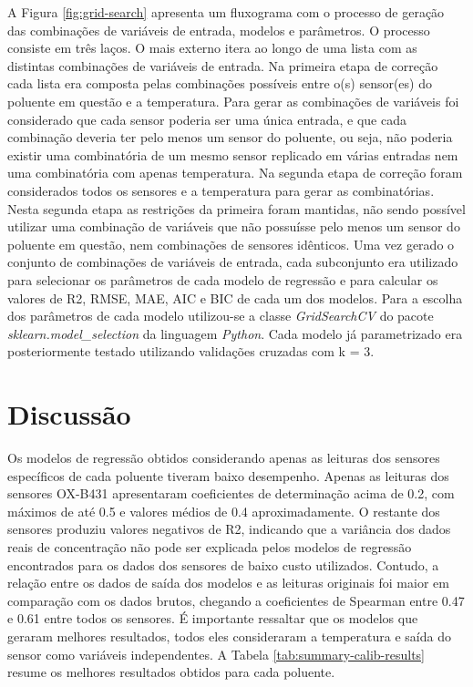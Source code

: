 A Figura \ref{fig:grid-search} apresenta um fluxograma com o processo de geração das combinações de variáveis de entrada, modelos e parâmetros. O processo consiste em três laços. O mais externo itera ao longo de uma lista com as distintas combinações de variáveis de entrada. Na primeira etapa de correção cada lista era composta pelas combinações possíveis entre o(s) sensor(es) do poluente em questão e a temperatura. Para gerar as combinações de variáveis foi considerado que cada sensor poderia ser uma única entrada, e que cada combinação deveria ter pelo menos um sensor do poluente, ou seja, não poderia existir uma combinatória de um mesmo sensor replicado em várias entradas nem uma combinatória com apenas temperatura. Na segunda etapa de correção foram considerados todos os sensores e a temperatura para gerar as combinatórias. Nesta segunda etapa as restrições da primeira foram mantidas, não sendo possível utilizar uma combinação de variáveis que não possuísse pelo menos um sensor do poluente em questão, nem combinações de sensores idênticos. Uma vez gerado o conjunto de combinações de variáveis de entrada, cada subconjunto era utilizado para selecionar os parâmetros de cada modelo de regressão e para calcular os valores de R2, RMSE, MAE, AIC e BIC de cada um dos modelos. Para a escolha dos parâmetros de cada modelo utilizou-se a classe \textit{GridSearchCV} do pacote \textit{sklearn.model\_selection} da linguagem \textit{Python}. Cada modelo já parametrizado era posteriormente testado utilizando validações cruzadas com k = 3.









\section{Discussão}

Os modelos de regressão obtidos considerando apenas as leituras dos sensores específicos de cada poluente tiveram baixo desempenho. Apenas as leituras dos sensores OX-B431 apresentaram coeficientes de determinação acima de 0.2, com máximos de até 0.5 e valores médios de 0.4 aproximadamente. O restante dos sensores produziu valores negativos de R2, indicando que a variância dos dados reais de concentração não pode ser explicada pelos modelos de regressão encontrados para os dados dos sensores de baixo custo utilizados. Contudo, a relação entre os dados de saída dos modelos e as leituras originais foi maior em comparação com os dados brutos, chegando a coeficientes de Spearman entre 0.47 e 0.61 entre todos os sensores. É importante ressaltar que os modelos que geraram melhores resultados, todos eles consideraram a temperatura e saída do sensor como variáveis independentes. A Tabela \ref{tab:summary-calib-results} resume os melhores resultados obtidos para cada poluente.

